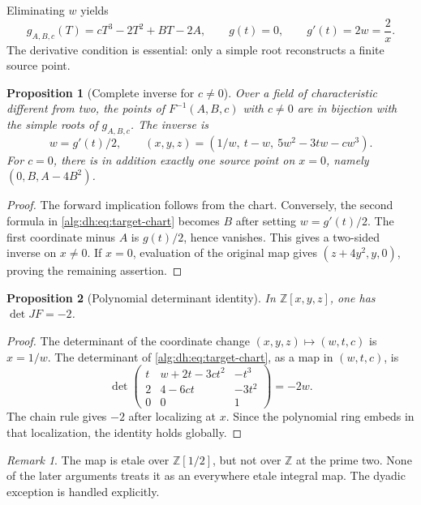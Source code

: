 \documentclass[11pt]{article}
\numberwithin{equation}{section}
\theoremstyle{plain}
\newtheorem{proposition}[proposition]{Proposition}
\theoremstyle{plain}
\theoremstyle{plain}
\theoremstyle{definition}
\theoremstyle{definition}
\theoremstyle{definition}
\theoremstyle{remark}
\newtheorem{remark}[remark]{Remark}
\newcommand{\Z}{\mathbb Z}\newcommand{\Q}{\mathbb Q}
\begin{document}
Eliminating $w$ yields
\begin{equation}\label{alg:dh:eq:cubic}
 g_{A,B,c}(T)=cT^3-2T^2+BT-2A,
 \qquad g(t)=0,\qquad g'(t)=2w=\frac2x.
\end{equation}
The derivative condition is essential: only a simple root reconstructs
a finite source point.

\begin{proposition}[Complete inverse for $c\ne0$]\label{alg:dh:prop:inverse}
Over a field of characteristic different from two, the points of
$F^{-1}(A,B,c)$ with $c\ne0$ are in bijection with the simple roots of
$g_{A,B,c}$. The inverse is
\[
 w=g'(t)/2,\qquad
 (x,y,z)=(1/w,\ t-w,\ 5w^2-3tw-cw^3).
\]
For $c=0$, there is in addition exactly one source point on $x=0$,
namely $(0,B,A-4B^2)$.
\end{proposition}
\begin{proof}
The forward implication follows from the chart. Conversely, the second
formula in \eqref{alg:dh:eq:target-chart} becomes $B$ after setting $w=g'(t)/2$.
The first coordinate minus $A$ is $g(t)/2$, hence vanishes. This gives a
two-sided inverse on $x\ne0$. If $x=0$, evaluation of the original map
gives $(z+4y^2,y,0)$, proving the remaining assertion.
\end{proof}

\begin{proposition}[Polynomial determinant identity]\label{alg:dh:prop:det}
In $\Z[x,y,z]$, one has $\det JF=-2$.
\end{proposition}
\begin{proof}
The determinant of the coordinate change $(x,y,z)\mapsto(w,t,c)$ is
$x=1/w$. The determinant of \eqref{alg:dh:eq:target-chart}, as a map in
$(w,t,c)$, is
\[
 \det\begin{pmatrix}
 t&w+2t-3ct^2&-t^3\\
 2&4-6ct&-3t^2\\
 0&0&1
 \end{pmatrix}=-2w.
\]
The chain rule gives $-2$ after localizing at $x$. Since the polynomial
ring embeds in that localization, the identity holds globally.
\end{proof}

\begin{remark}
The map is etale over $\Z[1/2]$, but not over $\Z$ at the prime two.
None of the later arguments treats it as an everywhere etale integral
map. The dyadic exception is handled explicitly.
\end{remark}
\end{document}
